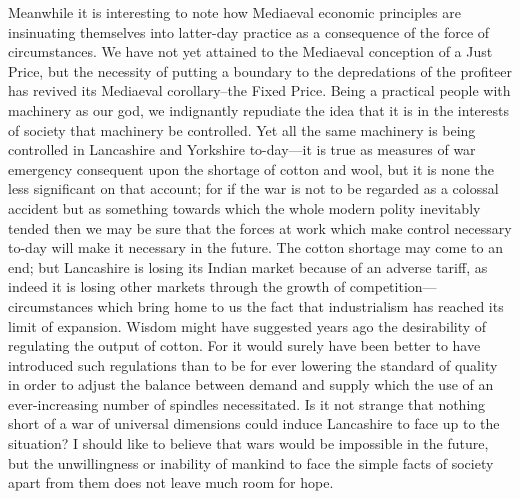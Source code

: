 \documentclass{book}
\begin{document}
Meanwhile it is interesting to note how Mediaeval economic principles are insinuating themselves into latter-day practice as a consequence of the force of circumstances. We have not yet attained to the Mediaeval conception of a Just Price, but the necessity of putting a boundary to the depredations of the profiteer has revived its Mediaeval corollary–the Fixed Price. Being a practical people with machinery as our god, we indignantly repudiate the idea that it is in the interests of society that machinery be controlled. Yet all the same machinery is being controlled in Lancashire and Yorkshire to-day\footnotemark[1]—it is true as measures of war emergency consequent upon the shortage of cotton and wool, but it is none the less significant on that account; for if the war is not to be regarded as a colossal accident but as something towards which the whole modern polity inevitably tended then we may be sure that the forces at work which make control necessary to-day will make it necessary in the future. The cotton shortage may come to an end; but Lancashire is losing its Indian market because of an adverse tariff, as indeed it is losing other markets through the growth of competition—circumstances which bring home to us the fact that industrialism has reached its limit of expansion. Wisdom might have suggested years ago the desirability of regulating the output of cotton. For it would surely have been better to have introduced such regulations than to be for ever lowering the standard of quality in order to adjust the balance between demand and supply which the use of an ever-increasing number of spindles necessitated. Is it not strange that nothing short of a war of universal dimensions could induce Lancashire to face up to the situation? I should like to believe that wars would be impossible in the future, but the unwillingness or inability of mankind to face the simple facts of society apart from them does not leave much room for hope.
\end{document}
